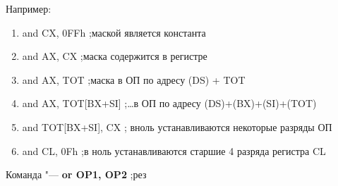 Например:

\begin{enumerate}
    \item and CX, 0FFh  ;маской является константа
    \item and AX, CX    ;маска содержится в регистре
    \item and AX, TOT   ;маска в ОП по адресу (DS) + TOT
    \item and AX, TOT[BX+SI]    ;\dots в ОП по адресу (DS)+(BX)+(SI)+(TOT) 
    \item and TOT[BX+SI], CX    ; вноль устанавливаются некоторые разряды ОП
    \item and CL, 0Fh    ;в ноль устанавливаются старшие 4 разряда регистра CL
\end{enumerate}

Команда "--- \textbf{or OP1, OP2} ;рез